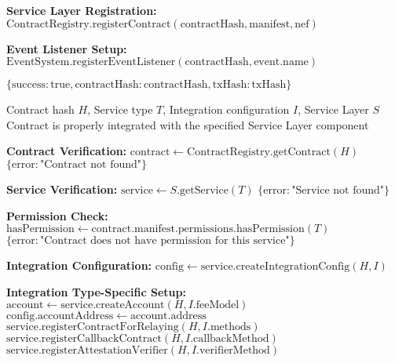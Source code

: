 \begin{protocol}
\begin{algorithmic}[1]
\State \textbf{Service Layer Registration:}
\State $\text{ContractRegistry}.\text{registerContract}(\text{contractHash}, \text{manifest}, \text{nef})$

\State \textbf{Event Listener Setup:}
    \State $\text{EventSystem}.\text{registerEventListener}(\text{contractHash}, \text{event}.\text{name})$
\EndFor

\State \Return $\{\text{success}: \text{true}, \text{contractHash}: \text{contractHash}, \text{txHash}: \text{txHash}\}$
\end{algorithmic}
\end{protocol}

\begin{protocol}
\label{prot:service-layer-integration}
\begin{algorithmic}[1]
\Require Contract hash $H$, Service type $T$, Integration configuration $I$, Service Layer $S$
\Ensure Contract is properly integrated with the specified Service Layer component

\State \textbf{Contract Verification:}
\State $\text{contract} \gets \text{ContractRegistry}.\text{getContract}(H)$
    \State \Return $\{\text{error}: \text{"Contract not found"}\}$
\EndIf

\State \textbf{Service Verification:}
\State $\text{service} \gets S.\text{getService}(T)$
    \State \Return $\{\text{error}: \text{"Service not found"}\}$
\EndIf

\State \textbf{Permission Check:}
\State $\text{hasPermission} \gets \text{contract}.\text{manifest}.\text{permissions}.\text{hasPermission}(T)$
    \State \Return $\{\text{error}: \text{"Contract does not have permission for this service"}\}$
\EndIf

\State \textbf{Integration Configuration:}
\State $\text{config} \gets \text{service}.\text{createIntegrationConfig}(H, I)$

\State \textbf{Integration Type-Specific Setup:}
    \State $\text{account} \gets \text{service}.\text{createAccount}(H, I.\text{feeModel})$
    \State $\text{config}.\text{accountAddress} \gets \text{account}.\text{address}$
    \State $\text{service}.\text{registerContractForRelaying}(H, I.\text{methods})$
    \State $\text{service}.\text{registerCallbackContract}(H, I.\text{callbackMethod})$
    \State $\text{service}.\text{registerAttestationVerifier}(H, I.\text{verifierMethod})$
\EndIf


\end{algorithmic}
\end{protocol}
